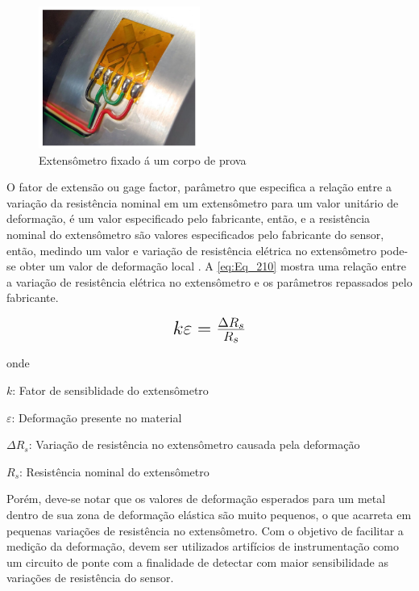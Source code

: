 \begin{figure}[H]
	\caption{\label{fig:1080} Extensômetro fixado á um corpo de prova}
	\begin{center}
		\includegraphics[width=200]{pictures/1080.png}
	\end{center}
\end{figure}

O fator de extensão ou gage factor, parâmetro que especifica a relação entre a variação da resistência nominal em um extensômetro para um valor unitário
de deformação, é um valor especificado pelo fabricante, então, e a resistência nominal do extensômetro são valores especificados pelo fabricante do sensor,
então, medindo um valor e variação de resistência elétrica no extensômetro pode-se obter um valor de deformação local \autocite{Hollman2011}.
A \autoref{eq:Eq_210} mostra uma relação entre a variação de resistência elétrica no extensômetro e os parâmetros repassados pelo fabricante.

\begin{equation}\label{eq:Eq_210}%
\mbox{\fontsize{17.28}{21.6}\selectfont\( %
k \varepsilon = \frac{\Delta R_s }{R_s}
\)} %
\end{equation}

onde

$k$: Fator de sensiblidade do extensômetro

$\varepsilon$: Deformação presente no material

$\Delta R_s$: Variação de resistência no extensômetro causada pela deformação

$R_s$: Resistência nominal do extensômetro

\hfill

Porém, deve-se notar que os valores de deformação esperados para um metal dentro de sua zona de deformação elástica são muito pequenos, o que acarreta em pequenas
variações de resistência no extensômetro. Com o objetivo de facilitar a medição da deformação, devem ser utilizados artifícios de instrumentação como um circuito de ponte
com a finalidade de detectar com maior sensibilidade as variações de resistência do sensor.

